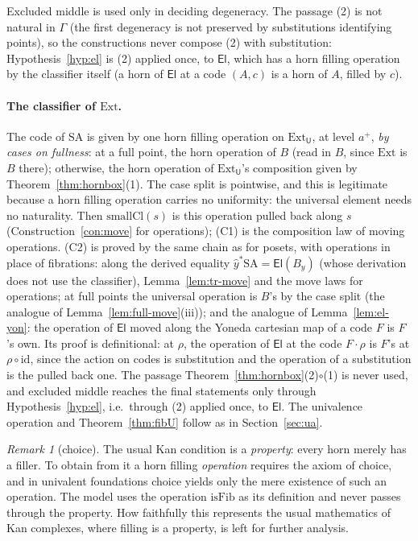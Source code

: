 \documentclass[11pt]{article}
\newcommand{\U}{\mathsf{U}}
\newcommand{\El}{\mathsf{El}}
\newcommand{\Ext}{\mathrm{Ext}}
\newcommand{\SA}{\mathrm{SA}}
\newcommand{\isFib}{\mathrm{isFib}}
\theoremstyle{plain}
\theoremstyle{definition}
\theoremstyle{remark}
\newtheorem{remark}[theorem]{Remark}
\begin{document}
Excluded middle is used only in deciding degeneracy. The passage (2) is
not natural in $\Gamma$ (the first degeneracy is not preserved by
substitutions identifying points), so the constructions never compose
(2) with substitution: Hypothesis~\ref{hyp:el} is (2) applied once, to
$\El$, which has a horn filling operation by the classifier itself (a
horn of $\El$ at a code $(A,c)$ is a horn of $A$, filled by $c$).

\paragraph{The classifier of $\Ext$.} The code of $\SA$ is given by one
horn filling operation on $\Ext_\U$, at level $a^+$, \emph{by cases on
fullness}: at a full point, the horn operation of $B$ (read in $B$, since
$\Ext$ is $B$ there); otherwise, the horn operation of $\Ext_\U$'s
composition given by Theorem~\ref{thm:hornbox}(1). The case split is
pointwise, and this is legitimate because a horn filling operation
carries no uniformity: the universal element needs no naturality. Then
$\mathrm{smallCl}(s)$ is this operation pulled back along $s$
(Construction~\ref{con:move} for operations); (C1) is the composition
law of moving operations. (C2) is proved by the same chain as for
posets, with operations in place of fibrations: along the derived
equality $\hat y^*\SA=\El(B_y)$ (whose derivation does not use the
classifier), Lemma~\ref{lem:tr-move} and the move laws for operations;
at full points the universal operation is $B$'s by the case split (the
analogue of Lemma~\ref{lem:full-move}(iii)); and the analogue of
Lemma~\ref{lem:el-yon}: the operation of $\El$ moved along the Yoneda
cartesian map of a code $F$ is $F$'s own. Its proof is definitional: at
$\rho$, the operation of $\El$ at the code $F\cdot\rho$ is $F$'s at
$\rho\circ\mathrm{id}$, since the action on codes is substitution and
the operation of a substitution is the pulled back one. The passage
Theorem~\ref{thm:hornbox}(2)$\circ$(1) is never used, and excluded
middle reaches the final statements only through
Hypothesis~\ref{hyp:el}, i.e.\ through (2) applied once, to $\El$. The univalence operation and
Theorem~\ref{thm:fibU} follow as in Section~\ref{sec:ua}.

\begin{remark}[choice]\label{rem:ac}
The usual Kan condition is a \emph{property}: every horn merely has a
filler. To obtain from it a horn filling \emph{operation} requires the
axiom of choice, and in univalent foundations choice yields only the
mere existence of such an operation. The model uses the operation
$\isFib$ as its definition and never passes through the property. How
faithfully this represents the usual mathematics of Kan complexes, where
filling is a property, is left for further analysis.
\end{remark}
\end{document}
